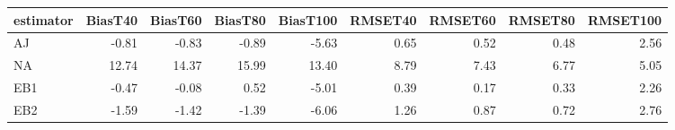 \begin{table}[ht]
\centering
\begin{tabular}{lrrrrrrrr}
  \toprule
estimator & BiasT40 & BiasT60 & BiasT80 & BiasT100 & RMSET40 & RMSET60 & RMSET80 & RMSET100 \\ 
  \midrule
AJ & -0.81 & -0.83 & -0.89 & -5.63 & 0.65 & 0.52 & 0.48 & 2.56 \\ 
  NA & 12.74 & 14.37 & 15.99 & 13.40 & 8.79 & 7.43 & 6.77 & 5.05 \\ 
  EB1 & -0.47 & -0.08 & 0.52 & -5.01 & 0.39 & 0.17 & 0.33 & 2.26 \\ 
  EB2 & -1.59 & -1.42 & -1.39 & -6.06 & 1.26 & 0.87 & 0.72 & 2.76 \\ 
   \bottomrule
\end{tabular}
\end{table}
